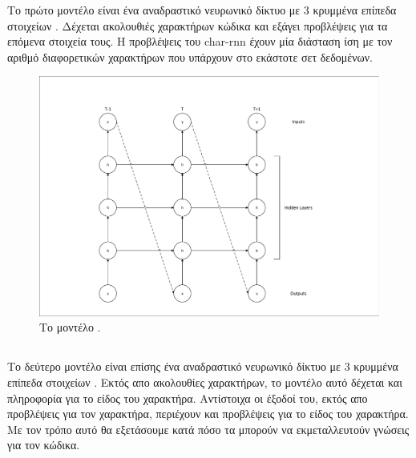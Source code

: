 Το πρώτο μοντέλο είναι ένα αναδραστικό νευρωνικό δίκτυο με 3 κρυμμένα επίπεδα στοιχείων .
Δέχεται ακολουθιές χαρακτήρων κώδικα και εξάγει προβλέψεις για τα επόμενα στοιχεία τους.
Η προβλέψεις του char-rnn έχουν μία διάσταση ίση με τον αριθμό διαφορετικών χαρακτήρων που υπάρχουν στο εκάστοτε σετ δεδομένων.   

\begin{figure}[h]
	\includegraphics[width=\textwidth, trim = 4 4 4 4, clip, keepaspectratio]{images/char-rnn.pdf}
	\centering 
	\caption{Το μοντέλο .}
	\label{fig:char-rnn}
\end{figure}

\subsection{}

Το δεύτερο μοντέλο είναι επίσης ένα αναδραστικό νευρωνικό δίκτυο με 3 κρυμμένα επίπεδα στοιχείων . 
Εκτός απο ακολουθίες χαρακτήρων, το μοντέλο αυτό δέχεται και πληροφορία για το είδος του χαρακτήρα. 
Αντίστοιχα οι έξοδοί του, εκτός απο προβλέψεις για τον χαρακτήρα, περιέχουν και προβλέψεις για το είδος του χαρακτήρα. Με τον τρόπο αυτό θα εξετάσουμε κατά πόσο τα  μπορούν να εκμεταλλευτούν  γνώσεις για τον κώδικα. 

